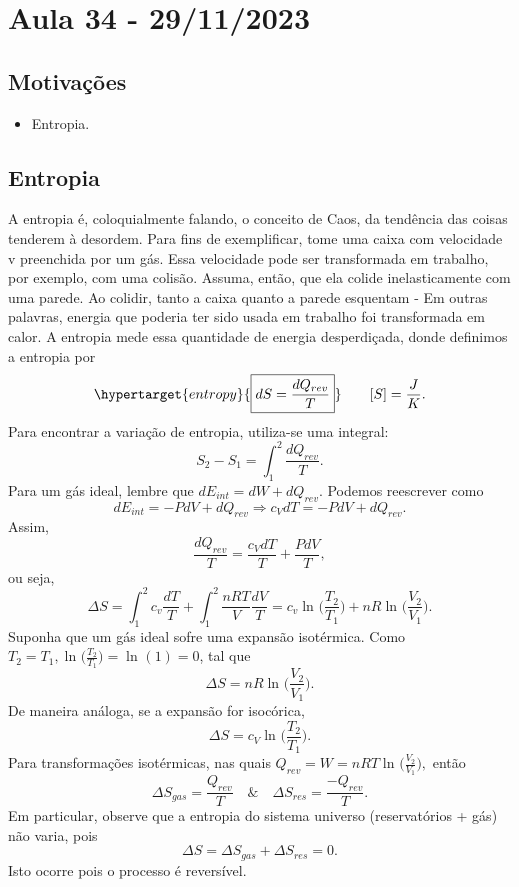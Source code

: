 \documentclass[PhysicsII/phsyicsII_notes.tex]{subfiles}
\begin{document}
\section{Aula 34 - 29/11/2023}
\subsection{Motivações}
\begin{itemize}
	\item Entropia.
\end{itemize}
\subsection{Entropia}
A entropia é, coloquialmente falando, o conceito de Caos, da tendência das coisas tenderem à desordem.
Para fins de exemplificar, tome uma caixa com velocidade v preenchida por um gás. Essa velocidade pode ser transformada
em trabalho, por exemplo, com uma colisão. Assuma, então, que ela colide inelasticamente com uma parede. Ao colidir, tanto a
caixa quanto a parede esquentam - Em outras palavras, energia que poderia ter sido usada em trabalho foi transformada em calor.
A entropia mede essa quantidade de energia desperdiçada, donde definimos a entropia por
\[
	\hypertarget{entropy}{\boxed{dS = \frac{dQ_{rev}}{T}}}\quad\quad [S] = \frac{J}{K}.
\]
Para encontrar a variação de entropia, utiliza-se uma integral:
\[
	S_{2}-S_{1} = \int_{1}^{2}\frac{dQ_{rev}}{T}.
\]
Para um gás ideal, lembre que \(dE_{int} = dW + dQ_{rev}\). Podemos reescrever como
\[
	dE_{int} = -PdV + dQ_{rev}\Rightarrow c_{V}dT = -PdV + dQ_{rev}.
\]
Assim,
\[
	\frac{dQ_{rev}}{T} = \frac{c_{V}dT}{T}+\frac{PdV}{T},
\]
ou seja,
\[
	\Delta S = \int_{1}^{2} c_{v}\frac{dT}{T} + \int_{1}^{2} \frac{nRT}{V}\frac{dV}{T} = c_{v}\ln^{}{\biggl(\frac{T_{2}}{T_{1}}\biggr)} + nR\ln^{}{\biggl(\frac{V_{2}}{V_{1}}\biggr)}.
\]
Suponha que um gás ideal sofre uma expansão isotérmica. Como \(T_{2} = T_{1}, \ln^{}{\biggl(\frac{T_{2}}{T_{1}}\biggr)} = \ln^{}{(1)}=0\),
tal que
\[
	\Delta S = nR\ln^{}{\biggl(\frac{V_{2}}{V_{1}}\biggr)}.
\]
De maneira análoga, se a expansão for isocórica,
\[
	\Delta S = c_{V}\ln^{}{\biggl(\frac{T_{2}}{T_{1}}\biggr)}.
\]
Para transformações isotérmicas, nas quais \(Q_{rev} = W = nRT\ln^{}{\biggl(\frac{V_{2}}{V_{1}}\biggr)},\) então
\[
	\Delta S_{gas} = \frac{Q_{rev}}{T}\quad\&\quad \Delta S_{res} = \frac{-Q_{rev}}{T}.
\]
Em particular, observe que a entropia do sistema universo (reservatórios + gás) não varia, pois
\[
	\Delta S = \Delta S_{gas} + \Delta S_{res} = 0.
\]
Isto ocorre pois o processo é reversível.
\end{document}
